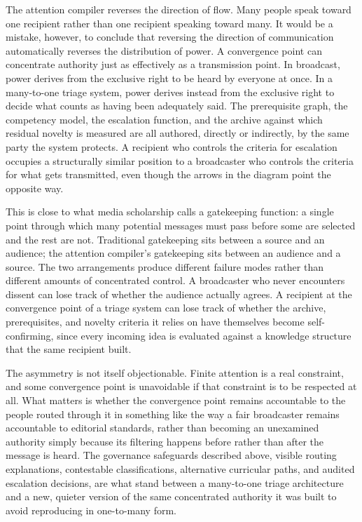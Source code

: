 \documentclass[11pt]{article}
\begin{document}
The attention compiler reverses the direction of flow. Many people speak toward one recipient rather than one recipient speaking toward many. It would be a mistake, however, to conclude that reversing the direction of communication automatically reverses the distribution of power. A convergence point can concentrate authority just as effectively as a transmission point. In broadcast, power derives from the exclusive right to be heard by everyone at once. In a many-to-one triage system, power derives instead from the exclusive right to decide what counts as having been adequately said. The prerequisite graph, the competency model, the escalation function, and the archive against which residual novelty is measured are all authored, directly or indirectly, by the same party the system protects. A recipient who controls the criteria for escalation occupies a structurally similar position to a broadcaster who controls the criteria for what gets transmitted, even though the arrows in the diagram point the opposite way.

This is close to what media scholarship calls a gatekeeping function: a single point through which many potential messages must pass before some are selected and the rest are not. Traditional gatekeeping sits between a source and an audience; the attention compiler's gatekeeping sits between an audience and a source. The two arrangements produce different failure modes rather than different amounts of concentrated control. A broadcaster who never encounters dissent can lose track of whether the audience actually agrees. A recipient at the convergence point of a triage system can lose track of whether the archive, prerequisites, and novelty criteria it relies on have themselves become self-confirming, since every incoming idea is evaluated against a knowledge structure that the same recipient built.

The asymmetry is not itself objectionable. Finite attention is a real constraint, and some convergence point is unavoidable if that constraint is to be respected at all. What matters is whether the convergence point remains accountable to the people routed through it in something like the way a fair broadcaster remains accountable to editorial standards, rather than becoming an unexamined authority simply because its filtering happens before rather than after the message is heard. The governance safeguards described above, visible routing explanations, contestable classifications, alternative curricular paths, and audited escalation decisions, are what stand between a many-to-one triage architecture and a new, quieter version of the same concentrated authority it was built to avoid reproducing in one-to-many form.
\end{document}
